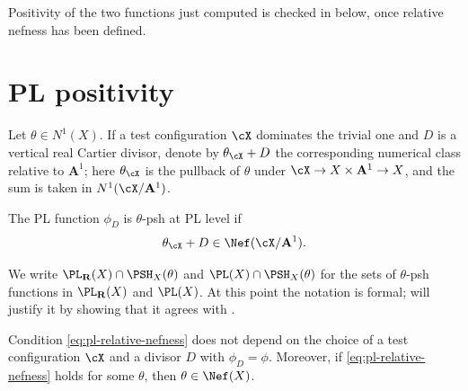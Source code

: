 Positivity of the two functions just computed is checked in
 below, once relative nefness has been defined.
\section{PL positivity}
\label{sec:ch34-pl-positivity}

Let $\theta\in N^1(X)$.  If a test configuration $\cX$ dominates the
trivial one and $D$ is a vertical real Cartier divisor, denote by
$\theta_{\cX}+D$ the corresponding numerical class relative to
$\mathbf A^1$; here $\theta_{\cX}$ is the pullback of $\theta$ under
$\cX\to X\times\mathbf A^1\to X$, and the sum is taken in
$N^1(\cX/\mathbf A^1)$.

\begin{definition}
\label{def:positive-pl-function}
The PL function $\phi_D$ is $\theta$-psh at PL level if
\begin{equation}
\label{eq:pl-relative-nefness}
 \theta_{\cX}+D\in\Nef(\cX/\mathbf A^1).
\end{equation}
\end{definition}

We write $\PL_{\mathbf R}(X)\cap\PSH_X(\theta)$ and
$\PL(X)\cap\PSH_X(\theta)$ for the sets of $\theta$-psh functions in
$\PL_{\mathbf R}(X)$ and $\PL(X)$.  At this point the notation is
formal;  will justify it by showing that it
agrees with .

\begin{lemma}
\label{lem:ch34-pl-positivity-well-posed}
Condition \eqref{eq:pl-relative-nefness} does not depend on the choice of a
test configuration $\cX$ and a divisor $D$ with $\phi_D=\phi$.
Moreover, if \eqref{eq:pl-relative-nefness} holds for some $\theta$, then
$\theta\in\Nef(X)$.
\end{lemma}

